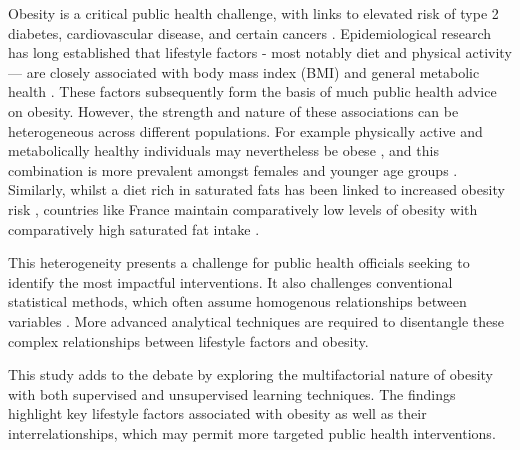 Obesity is a critical public health challenge, with links to elevated risk of type 2 diabetes, cardiovascular disease, and certain cancers \cite{Kinlen2018}. Epidemiological research has long established that lifestyle factors - most notably diet and physical activity — are closely associated with body mass index (BMI) and general metabolic health \cite{Bergens2020}. These factors subsequently form the basis of much public health advice on obesity. However, the strength and nature of these associations can be heterogeneous across different populations. For example physically active and metabolically healthy individuals may nevertheless be obese \cite{Alcazar2021}, and this combination is more prevalent amongst females and younger age groups \cite{Bluher2020}. Similarly, whilst a diet rich in saturated fats has been linked to increased obesity risk \cite{Wang2020}, countries like France maintain comparatively low levels of obesity with comparatively high saturated fat intake \cite{Ducrot2018}.

This heterogeneity presents a challenge for public health officials seeking to identify the most impactful interventions. It also challenges conventional statistical methods, which often assume homogenous relationships between variables \cite{Hoekstra2012}. More advanced analytical techniques are required to disentangle these complex relationships between lifestyle factors and obesity.

This study adds to the debate by exploring the multifactorial nature of obesity with both supervised and unsupervised learning techniques. The findings highlight key lifestyle factors associated with obesity as well as their interrelationships, which may permit more targeted public health interventions.
